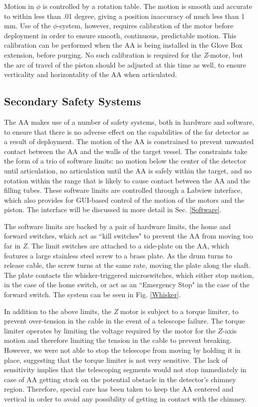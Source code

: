 	Motion in $\phi$ is controlled by a rotation table. The motion is smooth and accurate to within less than .01 degree, giving a position inaccuracy of much less than 1 mm. Use of the $\phi$-system, however, requires calibration of the motor before deployment in order to ensure smooth, continuous, predictable motion. This calibration can be performed when the AA is being installed in the Glove Box extension, before purging. No such calibration is required for the \emph{Z}-motor, but the arc of travel of the piston should be adjusted at this time as well, to ensure verticality and horizontality of the AA when articulated. 
	
	\subsection{Secondary Safety Systems}	
	The AA makes use of a number of safety systems, both in hardware and software, to ensure that there is no adverse effect on the capabilities of the far detector as a result of deployment. The motion of the AA is constrained to prevent unwanted contact between the AA and the walls of the target vessel. The constraints take the form of a trio of software limits: no motion below the center of the detector until articulation, no articulation until the AA is safely within the target, and no rotation within the range that is likely to cause contact between the AA and the filling tubes. These software limits are controlled through a Labview interface, which also provides for GUI-based control of the motion of the motors and the piston. The interface will be discussed in more detail in Sec. \ref{Software}.
	
	The software limits are backed by a pair of hardware limits, the home and forward switches, which act as ``kill switches" to prevent the AA from moving too far in \emph{Z}. The limit switches are attached to a side-plate on the AA, which features a large stainless steel screw to a brass plate.  As the drum turns to release cable, the screw turns at the same rate, moving the plate along the shaft. The plate contacts the whisker-triggered microswitches, which either stop motion, in the case of the home switch, or act as an ``Emergency Stop" in the case of the forward switch. The system can be seen in Fig. \ref{Whisker}. 
	
	In addition to the above limits, the \emph{Z} motor is subject to a torque limiter, to prevent over-tension in the cable in the event of a telescope failure. The torque limiter operates by limiting the voltage required by the motor for the $Z$-axis motion and therefore limiting the tension in the cable to prevent breaking. However, we were not able to stop the telescope from moving by holding it in place, suggesting that the torque limiter is not very sensitive. The lack of sensitivity implies that the telescoping segments would not stop immediately in case of AA getting stuck on the potential obstacle in the detector's chimney region. Therefore, special care has been taken to keep the AA centered and vertical in order to avoid any possibility of getting in contact with the chimney. 
	
